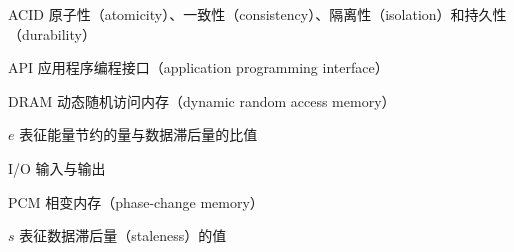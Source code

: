 \begin{denotation}
\item[ACID] 原子性（atomicity）、一致性（consistency）、隔离性（isolation）和持久性（durability）
\item[API] 应用程序编程接口（application programming interface）
\item[DRAM] 动态随机访问内存（dynamic random access memory）
\item[$e$] 表征能量节约的量与数据滞后量的比值
\item[I/O] 输入与输出
\item[PCM] 相变内存（phase-change memory）
\item[$s$] 表征数据滞后量（staleness）的值
\end{denotation}
